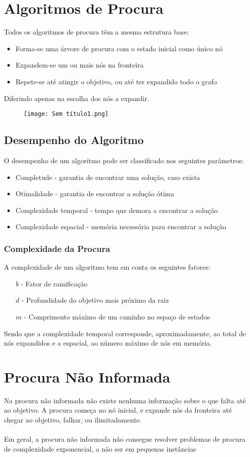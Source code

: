 \documentclass[10pt,a4paper]{report}
\begin{document}
\section{Algoritmos de Procura}
Todos os algoritmos de procura têm a mesma estrutura base:
\begin{itemize}
\item Forma-se uma árvore de procura com o estado inicial como único nó
\item Expandem-se um ou mais nós na fronteira
\item Repete-se até atingir o objetivo, ou até ter expandido todo o grafo
\end{itemize}
Diferindo apenas na escolha dos nós a expandir.
\begin{figure}[H]
\centering
\texttt{[image: Sem título1.png]}
\end{figure}
\subsection{Desempenho do Algoritmo}
O desempenho de um algoritmo pode ser classificado nos seguintes parâmetros:
\begin{itemize}
\item Completude - garantia de encontrar uma solução, caso exista
\item Otimalidade - garantia de encontrar a solução ótima
\item Complexidade temporal - tempo que demora a encontrar a solução
\item Complexidade espacial - memória necessária para encontrar a solução
\end{itemize}
\subsubsection{Complexidade da Procura}
A complexidade de um algoritmo tem em conta os seguintes fatores:
\begin{itemize}
\item[$b$] - Fator de ramificação 
\item[$d$] - Profundidade do objetivo mais próximo da raiz
\item[$m$] - Comprimento máximo de um caminho no espaço de estados
\end{itemize}
Sendo que a complexidade temporal corresponde, aproximadamente, ao total de nós expandidos e a espacial, ao número máximo de nós em memória.
\section{Procura Não Informada}
Na procura não informada não existe nenhuma informação sobre o que falta até ao objetivo. A procura começa no nó inicial, e expande nós da fronteira até chegar ao objetivo, falhar, ou ilimitadamente.\\
\\
Em geral, a procura não informada não consegue resolver problemas de procura de complexidade exponencial, a não ser em pequenas instâncias
\end{document}
